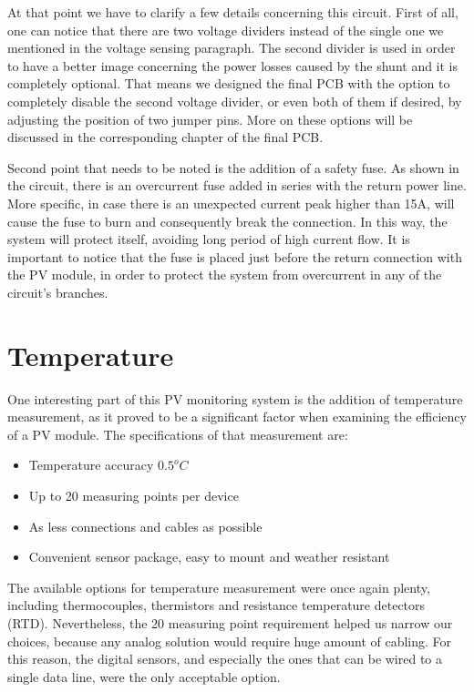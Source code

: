 At that point we have to clarify a few details concerning this circuit. First of all, one can notice that there are two voltage dividers instead of the single one we mentioned in the voltage sensing paragraph. The second divider is used in order to have a better image concerning the power losses caused by the shunt and it is completely optional. That means we designed the final PCB with the option to completely disable the second voltage divider, or even both of them if desired, by adjusting the position of two jumper pins. More on these options will be discussed in the corresponding chapter of the final PCB.

Second point that needs to be noted is the addition of a safety fuse. As shown in the circuit, there is an overcurrent fuse added in series with the return power line. More specific, in case there is an unexpected current peak higher than 15A, will cause the fuse to burn and consequently break the connection. In this way, the system will protect itself, avoiding long period of high current flow. It is important to notice that the fuse is placed just before the return connection with the PV module, in order to protect the system from overcurrent in any of the circuit's branches.

\section{Temperature}
One interesting part of this PV monitoring system is the addition of temperature measurement, as it proved to be a significant factor when examining the efficiency of a PV module. The specifications of that measurement are:

\begin{itemize}
    \item Temperature accuracy $0.5^oC$
    \item Up to 20 measuring points per device
    \item As less connections and cables as possible
    \item Convenient sensor package, easy to mount and weather resistant
\end{itemize}

The available options for temperature measurement were once again plenty, including thermocouples, thermistors and  resistance temperature detectors (RTD). Nevertheless, the 20 measuring point requirement helped us narrow our choices, because any analog solution would require huge amount of cabling. For this reason, the digital sensors, and especially the ones that can be wired to a single data line, were the only acceptable option.

